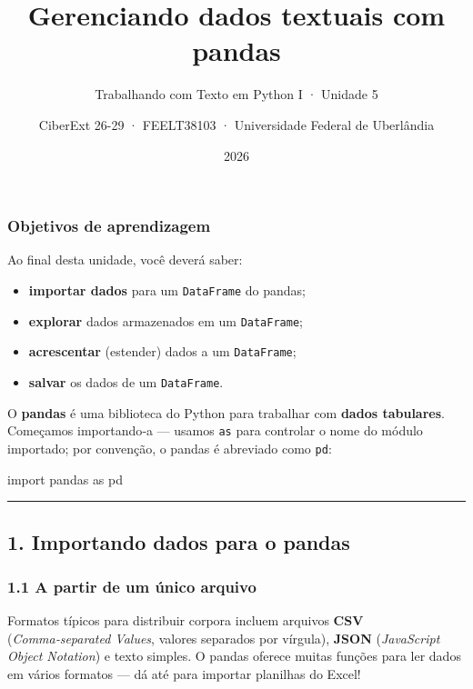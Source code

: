 \documentclass[
  brazilian,
  11pt,
]{article}
\title{Gerenciando dados textuais com pandas}
\subtitle{Trabalhando com Texto em Python I · Unidade 5}
\author{CiberExt 26-29 · FEELT38103 · Universidade Federal de
Uberlândia}
\date{2026}
\newenvironment{Shaded}{\begin{snugshade}}{\end{snugshade}}
\newcommand{\ImportTok}[1]{\textcolor[rgb]{0.15,0.68,0.38}{#1}}
\newcommand{\NormalTok}[1]{\textcolor[rgb]{0.81,0.81,0.76}{#1}}
\providecommand{\tightlist}{%
  \setlength{\itemsep}{0pt}\setlength{\parskip}{0pt}}
\let\oldtexttt\texttt
\renewcommand{\texttt}[1]{{\color{inlink}\oldtexttt{#1}}}
\begin{document}
\maketitle

{
\setcounter{tocdepth}{2}
\tableofcontents
}
\subsubsection{Objetivos de
aprendizagem}\label{objetivos-de-aprendizagem}

Ao final desta unidade, você deverá saber:

\begin{itemize}
\tightlist
\item
  \textbf{importar dados} para um \texttt{DataFrame} do pandas;
\item
  \textbf{explorar} dados armazenados em um \texttt{DataFrame};
\item
  \textbf{acrescentar} (estender) dados a um \texttt{DataFrame};
\item
  \textbf{salvar} os dados de um \texttt{DataFrame}.
\end{itemize}

O \textbf{pandas} é uma biblioteca do Python para trabalhar com
\textbf{dados tabulares}. Começamos importando‑a --- usamos \texttt{as}
para controlar o nome do módulo importado; por convenção, o pandas é
abreviado como \texttt{pd}:

\begin{Shaded}
\begin{Highlighting}[]
\ImportTok{import}\NormalTok{ pandas }\ImportTok{as}\NormalTok{ pd}
\end{Highlighting}
\end{Shaded}

\begin{center}\rule{0.5\linewidth}{0.5pt}\end{center}

\subsection{1. Importando dados para o
pandas}\label{importando-dados-para-o-pandas}

\subsubsection{1.1 A partir de um único
arquivo}\label{a-partir-de-um-uxfanico-arquivo}

Formatos típicos para distribuir corpora incluem arquivos \textbf{CSV}
(\emph{Comma‑separated Values}, valores separados por vírgula),
\textbf{JSON} (\emph{JavaScript Object Notation}) e texto simples. O
pandas oferece muitas funções para ler dados em vários formatos --- dá
até para importar planilhas do Excel!
\end{document}
